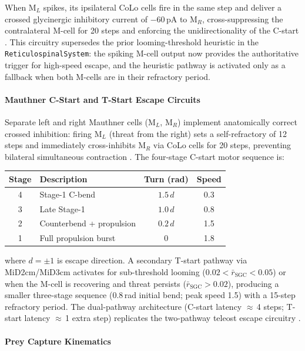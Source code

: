 \documentclass[12pt]{article}
\begin{document}
When $\text{M}_L$ spikes, its ipsilateral CoLo cells fire in the same step
and deliver a crossed glycinergic inhibitory current of $-60$\,pA to
$\text{M}_R$, cross-suppressing the contralateral M-cell for 20 steps and
enforcing the unidirectionality of the C-start \citep{kornfaber1975}.
This circuitry supersedes the prior looming-threshold heuristic in the
\texttt{ReticulospinalSystem}: the spiking M-cell output now provides the
authoritative trigger for high-speed escape, and the heuristic pathway
is activated only as a fallback when both M-cells are in their refractory
period.

\paragraph{Mauthner C-Start and T-Start Escape Circuits}

Separate left and right Mauthner cells ($\text{M}_L$, $\text{M}_R$)
implement anatomically correct crossed inhibition: firing $\text{M}_L$
(threat from the right) sets a self-refractory of 12 steps and
immediately cross-inhibits $\text{M}_R$ via CoLo cells for 20 steps,
preventing bilateral simultaneous contraction \citep{liu1998}.
The four-stage C-start motor sequence is:
\begin{center}
\begin{tabular}{clcc}
\hline
Stage & Description & Turn (rad) & Speed \\
\hline
4 & Stage-1 C-bend & $1.5\,d$ & 0.3 \\
3 & Late Stage-1   & $1.0\,d$ & 0.8 \\
2 & Counterbend + propulsion & $0.2\,d$ & 1.5 \\
1 & Full propulsion burst & 0 & 1.8 \\
\hline
\end{tabular}
\end{center}
where $d = \pm 1$ is escape direction.
A secondary T-start pathway via MiD2cm/MiD3cm activates for
sub-threshold looming ($0.02 < \bar r_\text{SGC} < 0.05$) or when
the M-cell is recovering and threat persists ($\bar r_\text{SGC} > 0.02$),
producing a smaller three-stage sequence (0.8\,rad initial bend;
peak speed 1.5) with a 15-step refractory period.
The dual-pathway architecture (C-start latency $\approx$\,4 steps;
T-start latency $\approx$\,1 extra step) replicates the
two-pathway teleost escape circuitry \citep{bhatt2007,temizer2015}.

\paragraph{Prey Capture Kinematics}
\end{document}
